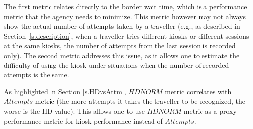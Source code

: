 \documentclass{cta-author}%
\newcommand{\cmt}[1]{}
\begin{document}
\cmt{
To conduct the analysis, the following two metrics were computed using data from all travellers, knowing that some of them used the system only once and some used it more than a hundred times, with 942 passages being the largest number of passages for a subject.

\begin{itemize}
\item      Metric 1: The proportion of travellers  who more likely than not are rejected by the system, i.e., for whom the average number of $Attempts$ %
is higher than 1.5. 
\item       Metric 2: The proportion of travellers  who have minimum matching score $HDNORM$ higher than 0.2.  
\end{itemize}


}

The first metric relates directly to the border wait time, which
is a  performance metric that the agency needs to minimize. 
This metric however may not  always show the actual number of attempts taken by a traveller (e.g., as described in Section~\ref{s.description}, when a traveller 
tries different kiosks or different sessions at the same kiosks, the number of attempts from the last session is recorded only). 
The second metric addresses this issue, as it allows one to estimate the difficulty of using the kiosk  under situations when the number of recorded attempts is the same.  


As highlighted in Section \ref{s.HDvsAttm},  $HDNORM$ metric correlates with $Attempts$ metric (the more attempts it takes the traveller to be recognized, the worse is the HD value). This allows one to use
$HDNORM$ metric as a proxy performance metric for kiosk performance instead of $Attempts$.

\end{document}
